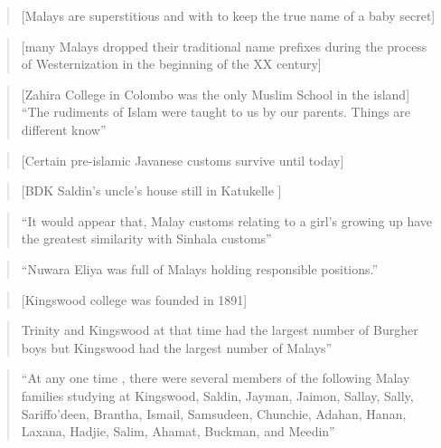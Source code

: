 \begin{quote}
    [Malays are superstitious and with to keep the true name of a baby secret]\citet[17]{Saldin2003}
\end{quote}

\begin{quote}
    [many Malays dropped their traditional name prefixes during the process of Westernization in the beginning of the XX century]
\end{quote}

\begin{quote}
    [Zahira College in Colombo was the only Muslim School in the island] \el ``The rudiments of Islam were taught to us  by our parents. \el Things are different know'' \citet[24]{Saldin2003}
\end{quote}

\begin{quote}
    [Certain pre-islamic Javanese customs survive until today]  \citet[24f]{Saldin2003}
\end{quote}

\begin{quote}
    [BDK Saldin's uncle's house still in Katukelle ]\citet[34]{Saldin2003}
\end{quote}

\begin{quote}
    ``It would appear that, Malay customs relating to a girl's growing up have the greatest similarity with Sinhala customs''\citet[35]{Saldin2003}
\end{quote}

\begin{quote}
    ``Nuwara Eliya was full of Malays holding responsible positions.''\citet[39]{Saldin2003}
\end{quote}

\begin{quote}
    [Kingswood college was founded in 1891]\citet[41]{Saldin2003}
\end{quote}


\begin{quote}
    Trinity and Kingswood at that time had the largest number of Burgher boys but Kingswood had the largest number of Malays''\citet[43]{Saldin2003}
\end{quote}

\begin{quote}
    ``At any one time , there were several members of the following Malay families studying at Kingswood, Saldin, Jayman, Jaimon, Sallay, Sally, Sariffo'deen, Brantha, Ismail, Samsudeen, Chunchie, Adahan, Hanan, Laxana, Hadjie, Salim, Ahamat, Buckman, and Meedin''\citet[43]{Saldin2003}
\end{quote}

